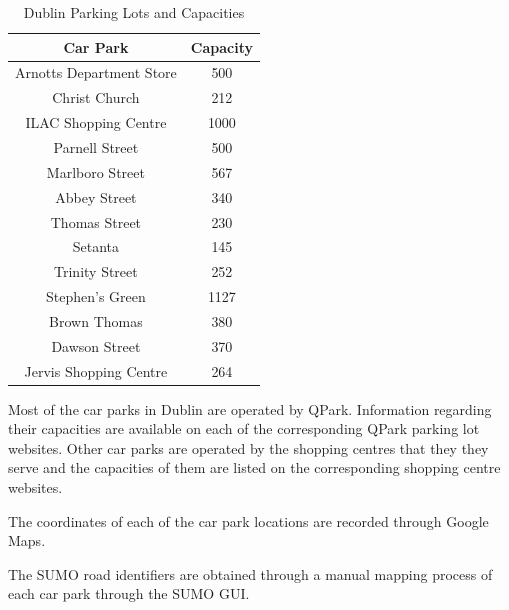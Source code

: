 \begin{table}[H]
    \begin{center}
        \begin{tabular}{||c c||} 
            \hline
            Car Park & Capacity\\ [0.5ex] 
            \hline\hline
            Arnotts Department Store & 500\\ 
            \hline
            Christ Church &  212\\
            \hline
            ILAC Shopping Centre & 1000 \\
            \hline
            Parnell Street & 500 \\
            \hline
            Marlboro Street & 567 \\
            \hline
            Abbey Street & 340 \\
            \hline
            Thomas Street & 230 \\
            \hline
            Setanta & 145 \\
            \hline
            Trinity Street & 252 \\
            \hline
            Stephen's Green & 1127 \\
            \hline
            Brown Thomas & 380 \\
            \hline
            Dawson Street & 370 \\
            \hline
            Jervis Shopping Centre & 264\\ [1ex]
            \hline
        \end{tabular}
        \caption{Dublin Parking Lots and Capacities}
        \label{table:carpark}
    \end{center}
\end{table}

Most of the car parks in Dublin are operated by QPark. Information regarding their capacities are available on each of the corresponding QPark parking lot websites. Other car parks are operated by the shopping centres that they they serve and the capacities of them are listed on the corresponding shopping centre websites.

The coordinates of each of the car park locations are recorded through Google Maps.

The SUMO road identifiers are obtained through a manual mapping process of each car park through the SUMO GUI.
